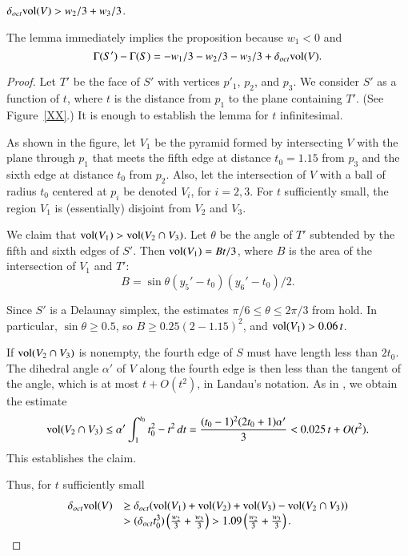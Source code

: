 
\begin{lemma}
$\delta_{oct} {\operatorname{vol}}(V) > w_2/3 + w_3/3 $.
\end{lemma}

The lemma immediately implies the proposition because $w_1<0$ and
$$\Gamma(S') -\Gamma(S) = -w_1/3 -w_2/3 -w_3/3 + \delta_{oct}{\operatorname{vol}}(V).$$


\begin{proof} Let $T'$ be the face of $S'$ with vertices $p'_1$,
$p_2$, and $p_3$. We consider $S'$ as a function of $t$, where $t$
is the distance from $p_1$ to the plane containing $T'$. (See
Figure~\ref{XX}.) It is enough to establish the lemma for $t$
infinitesimal.

As shown in the figure,  let $V_1$ be the pyramid formed by
intersecting $V$ with the plane through $p_1$ that meets the fifth
edge at distance $t_0=1.15$ from $p_3$ and the sixth edge at
distance $t_0$ from $p_2$. Also, let the intersection of $V$ with
a ball of radius $t_0$ centered at $p_i$ be denoted $V_i$, for
$i=2,3$.  For $t$ sufficiently small, the region $V_1$ is
(essentially) disjoint from $V_2$ and $V_3$.

We claim that ${\operatorname{vol}}(V_1) > {\operatorname{vol}}(V_2\cap V_3)$.
 Let $\theta$ be the angle of $T'$
subtended by the fifth and sixth edges of $S'$.  Then
${\operatorname{vol}}(V_1) = B t/3$, where $B$ is the area of the intersection
of $V_1$ and $T'$:
    \begin{equation}
    \label{eqn:874}
    B = \sin\theta (y_5'-t_0)(y_6'-t_0)/2.  %
    \end{equation}

Since $S'$ is a Delaunay simplex, the estimates
$\pi/6\le\theta\le2\pi/3$ from \cite{H1,2.3} hold.  In particular,
$\sin\theta\ge 0.5$, so $B\ge 0.25(2-1.15)^2$, and ${\operatorname{vol}}(V_1)>
0.06\,t$.

If ${\operatorname{vol}}(V_2\cap V_3)$ is nonempty, the fourth edge of $S$
must have length less than $2t_0$.  The dihedral angle $\alpha'$
of $V$ along the fourth edge is then less than the tangent of the
angle, which is at most $t+ {O}(t^2)$, in Landau's notation. As in
\cite{H1,5}, we obtain the estimate
$${\operatorname{vol}}(V_2\cap V_3) \le {\alpha'} \int_1^{t_0}
        t_0^2-t^2\,dt = \frac{ (t_0-1)^2(2t_0+1)\alpha'}{3}
        < 0.025\, t + {O}(t^2).$$
This establishes the claim.

Thus, for $t$ sufficiently small
   $$
   \begin{array}{lll}
   \delta_{oct}{\operatorname{vol}}(V) &\ge \delta_{oct}({\operatorname{vol}}(V_1) +{\operatorname{vol}}(V_2)
        +{\operatorname{vol}}(V_3) - {\operatorname{vol}}(V_2\cap V_3)) \\
        &>
        (\delta_{oct} t_0^3) \left( \frac{w_2}{3} + \frac{w_3}{3}\right)
        > 1.09 \left( \frac{w_2}{3} + \frac{w_3}{3}\right).
    \end{array}
    $$
\end{proof}


